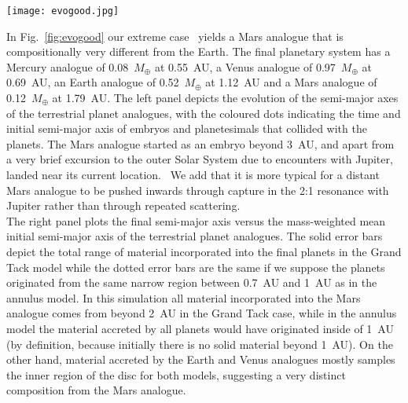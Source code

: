 \documentclass[preprint,5p,times,authoryear]{elsarticle}
\begin{document}
\begin{figure*}[ht!]
\texttt{[image: evogood.jpg]}
\caption{Dynamical evolution of an extreme case that yields a Mars analogue that is compositionally different from the Earth and Venus 
because it samples a distinctly different region of the protoplanetary disc. The left panel indicates the evolution of the semi-major 
axis of the four terrestrial planet analogues and the coloured dots indicate the initial semi-major axis and time of bodies that 
collide with the terrestrial planet analogues. The size of the dots is indicative of their mass. The Mars analogue gets scattered 
first outwards and then inwards by Jupiter and slowly migrates towards 1.8~AU through dynamical interaction with the remaining 
planetesimals. The right panel indicates the mass-weighted mean initial semi-major axis of material that is incorporated into the four 
terrestrial planet analogues. The error bars depict the total range of material incorporated into the final planets in the Grand Tack 
model while the dotted error bars are the same if we suppose the planets originated from the same narrow region between 0.7~AU and 
1~AU 
as in the annulus model.}
\label{fig:evogood}
\end{figure*}
In Fig.~\ref{fig:evogood} our extreme case {\ yields a Mars analogue that is compositionally very different from the Earth}. The 
final planetary system has a Mercury analogue of 0.08~$M_\oplus$ at 0.55~AU, a Venus analogue of 0.97~$M_\oplus$ at 0.69~AU, an Earth 
analogue of 0.52~$M_\oplus$ at 1.12~AU and a Mars analogue of 0.12~$M_\oplus$ at 1.79~AU. The left panel depicts the evolution of the 
semi-major axes of the terrestrial planet analogues, with the coloured dots indicating the time and initial semi-major axis of embryos 
and planetesimals that collided with the planets. The Mars analogue started as an embryo beyond 3~AU, and apart from a very brief 
excursion to the outer Solar System due to encounters with Jupiter, landed near its current location. {\ We add that it is more 
typical for a distant Mars analogue to be pushed inwards through capture in the 2:1 resonance with Jupiter rather than through 
repeated scattering.}\\

The right panel plots the final semi-major axis versus the mass-weighted mean initial semi-major axis of the terrestrial planet 
analogues. The solid error bars depict the total range of material incorporated into the final planets in the Grand Tack model while 
the dotted error bars are the same if we suppose the planets originated from the same narrow region between 0.7~AU and 1~AU as in the 
annulus model. In this simulation all material incorporated into the Mars analogue comes from beyond 2~AU in the Grand Tack case, 
while in the annulus model the material accreted by all planets would have originated inside of 1~AU (by definition, because initially 
there is no solid material beyond 1~AU). On the other hand, material accreted by the Earth and Venus analogues mostly samples the 
inner region of the disc for both models, suggesting a very distinct composition from the Mars analogue.\\
\end{document}
